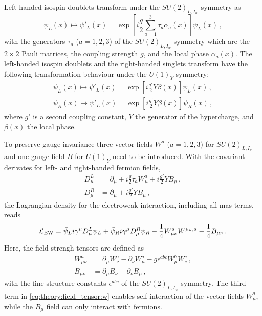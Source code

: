 Left-handed isospin doublets transform under the $SU{(2)}_{L,I_w}$ symmetry as
\begin{equation}
    \psi_L(x) \mapsto \psi'_L(x) = \exp \left[ i \frac{g}{2} \sum_{a=1}^{3} \tau_a \alpha_a(x) \right] \psi_L(x) \,,
\end{equation}
with the generators $\tau_a$ ($a = 1, 2, 3$) of the $SU{(2)}_{L,I_w}$ symmetry which are the $2\times 2$ Pauli matrices,
the coupling strength $g$, and the local phase $\alpha_a(x)$.
The left-handed isospin doublets and the right-handed singlets transform have the following transformation behaviour under the $U{(1)}_Y$ symmetry:
\begin{gather}
    \psi_L(x) \mapsto \psi'_L(x) = \exp \left[ i \frac{g'}{2} Y \beta(x) \right] \psi_L(x) \,, \\
    \psi_R(x) \mapsto \psi'_L(x) = \exp \left[ i \frac{g'}{2} Y \beta(x) \right] \psi_R(x) \,,
\end{gather}
where $g'$ is a second coupling constant, $Y$ the generator of the hypercharge, and $\beta(x)$ the local phase.

To preserve gauge invariance three vector fields $W^a$ ($a = 1,2,3$) for $SU{(2)}_{L,I_w}$ and one gauge field $B$
for $U{(1)}_Y$ need to be introduced.
With the covariant derivates for left- and right-handed fermion fields,
\begin{align}
    D_\mu^L &= \partial_\mu + i \frac{g}{2} \tau_a W_\mu^a + i \frac{g'}{2} Y B_\mu \,, \\
    D_\mu^R &= \partial_\mu + i \frac{g'}{2} Y B_\mu \,,
\end{align}
the Lagrangian density for the electroweak interaction, including all mas terms, reads
\begin{equation}
    \label{eq:theory:ew:l}
    \mathcal{L}_\text{EW} = \bar{\psi}_L i \gamma^\mu D_\mu^L \psi_L + \bar{\psi}_R i \gamma^\mu D_\mu^R \psi_R - \frac{1}{4} W_{\mu\nu}^a W^{\mu_\nu,a} - \frac{1}{4} B_{\mu\nu} \,.
\end{equation}
Here, the field strengh tensors are defined as
\begin{align}
    \label{eq:theory:field_tensor:w}
    W_{\mu\nu}^a &= \partial_\mu W_\nu^a - \partial_\nu W_\mu^a - g \epsilon^{abc} W_\mu^b W_\nu^c \,, \\
    B_{\mu\nu}   &= \partial_\mu B_\nu - \partial_\nu B_\mu \,,
\end{align}
with the fine structure constants $\epsilon^{abc}$ of the $SU{(2)}_{L,I_w}$ symmetry.
The third term in \cref{eq:theory:field_tensor:w} enables self-interaction of the vector fields $W^a_\mu$, while the $B_\mu$ field
can only interact with fermions.

